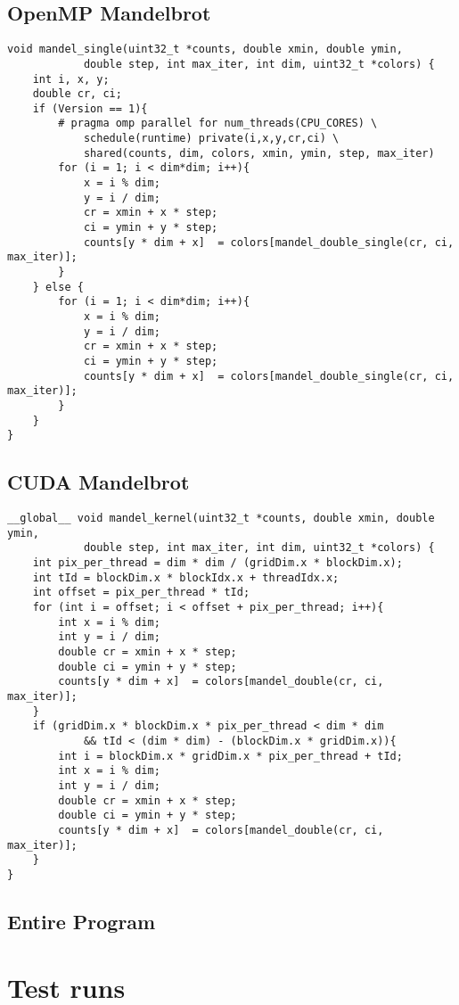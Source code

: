 \documentclass{article}
\begin{document}
        \subsection{OpenMP Mandelbrot}\label{appendix:omp}
\begin{lstlisting}
void mandel_single(uint32_t *counts, double xmin, double ymin,
            double step, int max_iter, int dim, uint32_t *colors) {
    int i, x, y;
    double cr, ci;
    if (Version == 1){
        # pragma omp parallel for num_threads(CPU_CORES) \
            schedule(runtime) private(i,x,y,cr,ci) \
            shared(counts, dim, colors, xmin, ymin, step, max_iter)
        for (i = 1; i < dim*dim; i++){
            x = i % dim;
            y = i / dim;
            cr = xmin + x * step;
            ci = ymin + y * step;
            counts[y * dim + x]  = colors[mandel_double_single(cr, ci, max_iter)];
        }
    } else {
        for (i = 1; i < dim*dim; i++){
            x = i % dim;
            y = i / dim;
            cr = xmin + x * step;
            ci = ymin + y * step;
            counts[y * dim + x]  = colors[mandel_double_single(cr, ci, max_iter)];
        }
    }
}
\end{lstlisting}

        \subsection{CUDA Mandelbrot}\label{appendix:cuda}
\begin{lstlisting}
__global__ void mandel_kernel(uint32_t *counts, double xmin, double ymin,
            double step, int max_iter, int dim, uint32_t *colors) {
    int pix_per_thread = dim * dim / (gridDim.x * blockDim.x);
    int tId = blockDim.x * blockIdx.x + threadIdx.x;
    int offset = pix_per_thread * tId;
    for (int i = offset; i < offset + pix_per_thread; i++){
        int x = i % dim;
        int y = i / dim;
        double cr = xmin + x * step;
        double ci = ymin + y * step;
        counts[y * dim + x]  = colors[mandel_double(cr, ci, max_iter)];
    }
    if (gridDim.x * blockDim.x * pix_per_thread < dim * dim
            && tId < (dim * dim) - (blockDim.x * gridDim.x)){
        int i = blockDim.x * gridDim.x * pix_per_thread + tId;
        int x = i % dim;
        int y = i / dim;
        double cr = xmin + x * step;
        double ci = ymin + y * step;
        counts[y * dim + x]  = colors[mandel_double(cr, ci, max_iter)];
    }
}
\end{lstlisting}

        \subsection{Entire Program} \label{appendix:mandelbrot.cu}
            

    \section{Test runs} \label{appendix:testdata}
        

 

\end{document}
